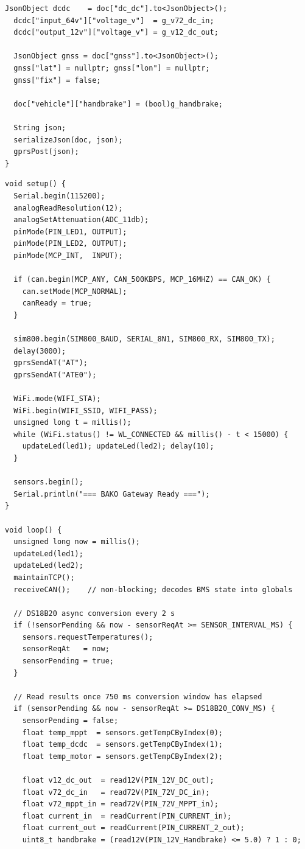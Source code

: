 \begin{lstlisting}[caption={GPRS heartbeat --- schema 2.0.0 JSON assembly}, label={lst:fw-json}]
  JsonObject dcdc    = doc["dc_dc"].to<JsonObject>();
  dcdc["input_64v"]["voltage_v"]  = g_v72_dc_in;
  dcdc["output_12v"]["voltage_v"] = g_v12_dc_out;

  JsonObject gnss = doc["gnss"].to<JsonObject>();
  gnss["lat"] = nullptr; gnss["lon"] = nullptr;
  gnss["fix"] = false;

  doc["vehicle"]["handbrake"] = (bool)g_handbrake;

  String json;
  serializeJson(doc, json);
  gprsPost(json);
}
\end{lstlisting}

\begin{lstlisting}[caption={setup() and loop() --- main cooperative execution model}, label={lst:fw-loop}]
void setup() {
  Serial.begin(115200);
  analogReadResolution(12);
  analogSetAttenuation(ADC_11db);
  pinMode(PIN_LED1, OUTPUT);
  pinMode(PIN_LED2, OUTPUT);
  pinMode(MCP_INT,  INPUT);

  if (can.begin(MCP_ANY, CAN_500KBPS, MCP_16MHZ) == CAN_OK) {
    can.setMode(MCP_NORMAL);
    canReady = true;
  }

  sim800.begin(SIM800_BAUD, SERIAL_8N1, SIM800_RX, SIM800_TX);
  delay(3000);
  gprsSendAT("AT");
  gprsSendAT("ATE0");

  WiFi.mode(WIFI_STA);
  WiFi.begin(WIFI_SSID, WIFI_PASS);
  unsigned long t = millis();
  while (WiFi.status() != WL_CONNECTED && millis() - t < 15000) {
    updateLed(led1); updateLed(led2); delay(10);
  }

  sensors.begin();
  Serial.println("=== BAKO Gateway Ready ===");
}

void loop() {
  unsigned long now = millis();
  updateLed(led1);
  updateLed(led2);
  maintainTCP();
  receiveCAN();    // non-blocking; decodes BMS state into globals

  // DS18B20 async conversion every 2 s
  if (!sensorPending && now - sensorReqAt >= SENSOR_INTERVAL_MS) {
    sensors.requestTemperatures();
    sensorReqAt   = now;
    sensorPending = true;
  }

  // Read results once 750 ms conversion window has elapsed
  if (sensorPending && now - sensorReqAt >= DS18B20_CONV_MS) {
    sensorPending = false;
    float temp_mppt  = sensors.getTempCByIndex(0);
    float temp_dcdc  = sensors.getTempCByIndex(1);
    float temp_motor = sensors.getTempCByIndex(2);

    float v12_dc_out  = read12V(PIN_12V_DC_out);
    float v72_dc_in   = read72V(PIN_72V_DC_in);
    float v72_mppt_in = read72V(PIN_72V_MPPT_in);
    float current_in  = readCurrent(PIN_CURRENT_in);
    float current_out = readCurrent(PIN_CURRENT_2_out);
    uint8_t handbrake = (read12V(PIN_12V_Handbrake) <= 5.0) ? 1 : 0;


\end{lstlisting}
